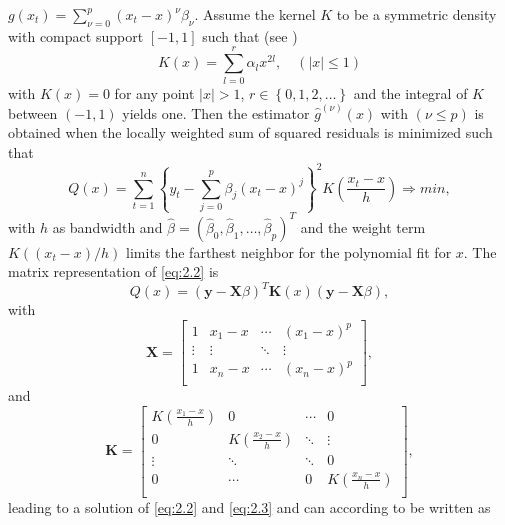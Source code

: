 \documentclass[12pt]{article}
\begin{document}
\(g(x_{t}) = \sum_{\nu=0}^{p}(x_{t} - x)^{\nu} \beta_{\nu} \).
Assume the kernel \(K\) to be a symmetric density with compact support \([-1,1] \) such that (see \textcite{gasser1984estimating})
\begin{equation}
\label{eq:Kernelfunction}
K(x) = \sum_{l=0}^{r}\alpha_l x^{2l}, \quad (|x| \leq 1)   %
\end{equation}
with \(K(x) = 0\) for any point \(|x| > 1\), \(r \in \left\lbrace0,1,2,\ldots \right\rbrace \) and the integral of \(K\) between \((-1,1)\) yields one. 
Then the estimator \(\hat{g}^{(\nu)}(x)\) with \((\nu \leq p)\) is obtained when the locally weighted sum of squared residuals is minimized such that
\begin{equation}
\label{eq:2.2}
Q(x) = \sum_{t=1}^{n} \left\lbrace y_{t} - \sum_{j=0}^{p} \beta_{j}(x_{t} - x)^{j} \right\rbrace^{2} K \left( \frac{x_{t} - x}{h} \right) \Rightarrow min ,
\end{equation}
with \(h\) as bandwidth and \(\hat{\beta} = (\hat{\beta}_{0},\hat{\beta}_{1},\ldots,\hat{\beta}_{p})^{T}\) and
the weight term \(K((x_{t} - x)/h)\) limits the farthest neighbor for the polynomial fit for \(x\).
The matrix representation of \eqref{eq:2.2} is 
\begin{equation}
\label{eq:2.3}
Q(x) = (\mathbf{y} - \mathbf{X}\beta)^{T} \mathbf{K}(x) (\mathbf{y} - \mathbf{X}\beta)  ,
\end{equation} 
with
$$
\mathbf{X} = \begin{bmatrix}
1   & x_1 - x &   \cdots  & (x_1 - x )^{p}  \\
\vdots & \vdots  & \ddots    & \vdots          \\
1   & x_n - x & \cdots    & (x_n - x )^{p}  \\
\end{bmatrix},
$$
and 
$$
\mathbf{K} = \begin{bmatrix}
K \left( \frac{x_{1}-x}{h}\right) & 0 								   & \cdots  & 0      \\
0 								  & K \left( \frac{x_{2}-x}{h}\right)  & \ddots  & \vdots \\
\vdots 							  & \ddots        					   & \ddots  & 0      \\
0   							  & \cdots 							   & 0  	 & K \left( \frac{x_{n}-x}{h}\right) \\
\end{bmatrix},
$$
leading to a solution of \eqref{eq:2.2} and \eqref{eq:2.3} and can according to \textcite{feng2004non} be written as
\end{document}
